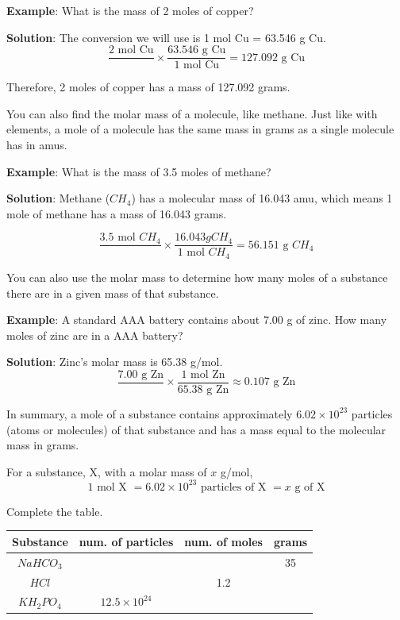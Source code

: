 \textbf{Example}: What is the mass of 2 moles of copper?

\textbf{Solution}: The conversion we will use is 1 mol Cu = 63.546 g Cu.
$$\frac{2 \text{ mol Cu}}{} \times \frac{63.546\text{ g Cu}}{1\text{ mol Cu}} = 
127.092\text{ g Cu}$$

Therefore, 2 moles of copper has a mass of 127.092 grams. 

You can also find the molar mass of a molecule, like methane. Just like with 
elements, a mole of a molecule has the same mass in grams as a single molecule has
in amus. 

\textbf{Example}: What is the mass of 3.5 moles of methane?

\textbf{Solution}: Methane ($CH_4$) has a molecular mass of 16.043 amu, which 
means 1 mole of methane has a mass of 16.043 grams. 

$$\frac{3.5\text{ mol }CH_4}{} \times \frac{16.043{ g }CH_4}{1\text{ mol }CH_4} = 
56.151\text{ g }CH_4$$

You can also use the molar mass to determine how many moles of a substance there 
are in a given mass of that substance.

\textbf{Example}: A standard AAA battery contains about 7.00 g of zinc. How many 
moles of zinc are in a AAA battery?

\textbf{Solution}: Zinc's molar mass is 65.38 g/mol. 
$$\frac{7.00\text{ g Zn}}{} \times \frac{1\text{ mol Zn}}{65.38\text{ g Zn}} 
\approx 0.107\text{ g Zn}$$

In summary, a mole of a substance contains approximately $6.02 \times 10^{23}$ 
particles (atoms or molecules) of that substance and has a mass equal to the 
molecular mass in grams. 

\begin{mdframed}[frametitle = {The Mole Concept}, style = important]
For a substance, X, with a molar mass of $x$ g/mol,
$$1\text{ mol X } = 6.02 \times 10^{23}\text{ particles of X }= x\text{ g of X}$$
\end{mdframed}

\begin{Exercise}[title = {Grams, Moles, Molecules, and Atoms}, label = convert]
Complete the table.

\begin{tabular}{|c|c|c|c|}
\hline
Substance & num. of particles & num. of moles & grams\\\hline
$NaHCO_3$ & & & 35\\\hline
$HCl$ & & 1.2 & \\\hline
$KH_2PO_4$ & $12.5 \times 10^{24}$ & & \\\hline
\end{tabular}
\vspace{75mm}
\end{Exercise}

